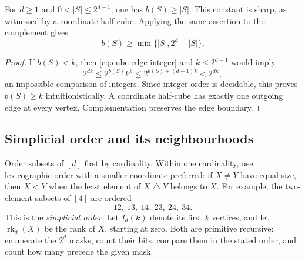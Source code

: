 \begin{corollary}
For \(d\geq1\) and \(0<|S|\leq2^{d-1}\), one has
\(b(S)\geq |S|\).  This constant is sharp, as witnessed by a coordinate
half-cube.  Applying the same assertion to the complement gives
\[
 b(S)\geq\min\{|S|,2^d-|S|\}.
\]
\end{corollary}
\begin{proof}
If \(b(S)<k\), then \eqref{eq:cube-edge-integer} and \(k\leq2^{d-1}\)
would imply
\[
 2^{dk}\leq2^{b(S)}k^k
 \leq2^{b(S)+(d-1)k}<2^{dk},
\]
an impossible comparison of integers.  Since integer order is decidable,
this proves \(b(S)\geq k\) intuitionistically.  A coordinate half-cube
has exactly one outgoing edge at every vertex.  Complementation preserves
the edge boundary.
\end{proof}

\subsection{Simplicial order and its neighbourhoods}

Order subsets of \([d]\) first by cardinality.  Within one cardinality,
use lexicographic order with a smaller coordinate preferred: if
\(X\neq Y\) have equal size, then \(X<Y\) when the least element of
\(X\mathbin{\triangle}Y\) belongs to \(X\).
For example, the two-element subsets of \([4]\) are ordered
\[
 12,\ 13,\ 14,\ 23,\ 24,\ 34.
\]
This is the \emph{simplicial order}.  Let \(I_d(k)\) denote its first
\(k\) vertices, and let \(\operatorname{rk}_d(X)\) be the rank of
\(X\), starting at zero.  Both are primitive recursive: enumerate the
\(2^d\) masks, count their bits, compare them in the stated order, and
count how many precede the given mask.

